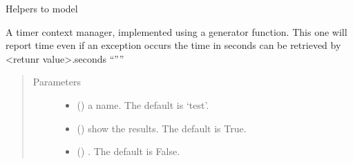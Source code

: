 \documentclass[letterpaper,10pt,english]{sphinxmanual}
\begin{document}
\begin{fulllineitems}
\label{\detokenize{index:modelclass.Model_help_Mixin}}
\pysigstartsignatures
{}
\pysigstopsignatures
\sphinxAtStartPar
Helpers to model

\begin{fulllineitems}
\label{\detokenize{index:modelclass.Model_help_Mixin.timer}}
\pysigstartsignatures
{}
\pysigstopsignatures
\sphinxAtStartPar
A timer context manager, implemented using a
generator function. This one will report time even if an exception occurs
the time in seconds can be retrieved by \textless{}retunr value\textgreater{}.seconds “””
\begin{quote}\begin{description}
\item[{Parameters}] \leavevmode\begin{itemize}
\item {} 
\sphinxAtStartPar
{} (\sphinxstyleliteralemphasis{\sphinxupquote{, }}) \textendash{} a name. The default is ‘test’.

\item {} 
\sphinxAtStartPar
{} (\sphinxstyleliteralemphasis{\sphinxupquote{, }}) \textendash{} show the results. The default is True.

\item {} 
\sphinxAtStartPar
{} (\sphinxstyleliteralemphasis{\sphinxupquote{, }}) \textendash{} . The default is False.


\end{itemize}
\end{description}
\end{quote}
\end{fulllineitems}
\end{fulllineitems}
\end{document}
